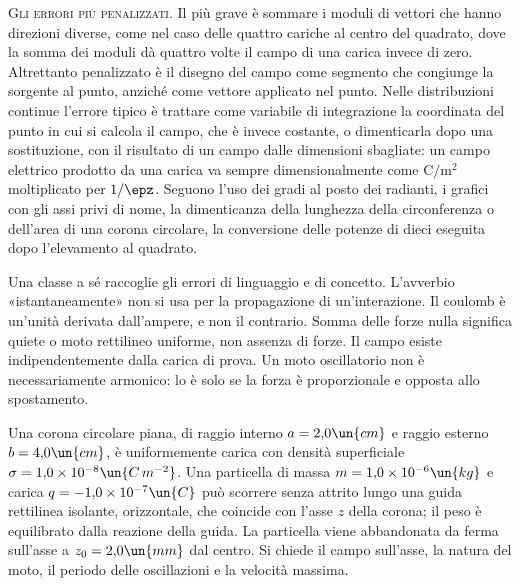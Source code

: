 \documentclass[main.tex]{subfiles}
\begin{document}
\medskip

\noindent\textsc{Gli errori più penalizzati.} Il più grave è sommare i moduli di vettori che hanno direzioni diverse, come nel caso delle quattro cariche al centro del quadrato, dove la somma dei moduli dà quattro volte il campo di una carica invece di zero. Altrettanto penalizzato è il disegno del campo come segmento che congiunge la sorgente al punto, anziché come vettore applicato nel punto. Nelle distribuzioni continue l'errore tipico è trattare come variabile di integrazione la coordinata del punto in cui si calcola il campo, che è invece costante, o dimenticarla dopo una sostituzione, con il risultato di un campo dalle dimensioni sbagliate: un campo elettrico prodotto da una carica va sempre dimensionalmente come $\mathrm{C}/\mathrm{m^2}$ moltiplicato per $1/\epz$. Seguono l'uso dei gradi al posto dei radianti, i grafici con gli assi privi di nome, la dimenticanza della lunghezza della circonferenza o dell'area di una corona circolare, la conversione delle potenze di dieci eseguita dopo l'elevamento al quadrato.

Una classe a sé raccoglie gli errori di linguaggio e di concetto. L'avverbio «istantaneamente» non si usa per la propagazione di un'interazione. Il coulomb è un'unità derivata dall'ampere, e non il contrario. Somma delle forze nulla significa quiete o moto rettilineo uniforme, non assenza di forze. Il campo esiste indipendentemente dalla carica di prova. Un moto oscillatorio non è necessariamente armonico: lo è solo se la forza è proporzionale e opposta allo spostamento.

\medskip

Una corona circolare piana, di raggio interno $a=2{,}0\un{cm}$ e raggio esterno $b=4{,}0\un{cm}$, è uniformemente carica con densità superficiale $\sigma=1{,}0\times10^{-8}\un{C\,m^{-2}}$. Una particella di massa $m=1{,}0\times10^{-6}\un{kg}$ e carica $q=-1{,}0\times10^{-7}\un{C}$ può scorrere senza attrito lungo una guida rettilinea isolante, orizzontale, che coincide con l'asse $z$ della corona; il peso è equilibrato dalla reazione della guida. La particella viene abbandonata da ferma sull'asse a $z_0=2{,}0\un{mm}$ dal centro. Si chiede il campo sull'asse, la natura del moto, il periodo delle oscillazioni e la velocità massima.
\end{document}
